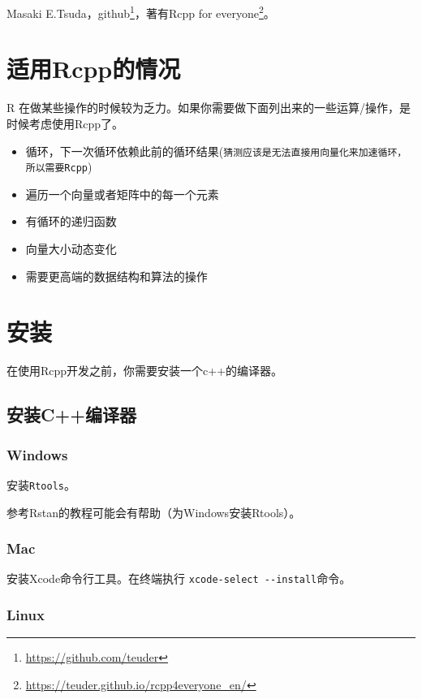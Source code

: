 \documentclass[]{ctexbook}
\providecommand{\tightlist}{%
  \setlength{\itemsep}{0pt}\setlength{\parskip}{0pt}}
\renewcommand{\href}[2]{#2\footnote{\url{#1}}}
\begin{document}
Masaki
E.Tsuda，\href{https://github.com/teuder}{github}，著有\href{https://teuder.github.io/rcpp4everyone_en/}{Rcpp
for everyone}。

\mainmatter

\chapter{适用Rcpp的情况}\label{situations}

R
在做某些操作的时候较为乏力。如果你需要做下面列出来的一些运算/操作，是时候考虑使用Rcpp了。

\begin{itemize}
\tightlist
\item
  循环，下一次循环依赖此前的循环结果(\texttt{猜测应该是无法直接用向量化来加速循环，所以需要Rcpp})
\item
  遍历一个向量或者矩阵中的每一个元素
\item
  有循环的递归函数
\item
  向量大小动态变化
\item
  需要更高端的数据结构和算法的操作
\end{itemize}

\chapter{安装}\label{install}

在使用Rcpp开发之前，你需要安装一个c++的编译器。

\section{安装C++编译器}\label{cppcompiler}

\subsection{Windows}\label{cppcwindows}

安装\texttt{Rtools}。

参考Rstan的教程可能会有帮助（为Windows安装Rtools）。

\subsection{Mac}\label{cppmac}

安装Xcode命令行工具。在终端执行 \texttt{xcode-select\ -\/-install}命令。

\subsection{Linux}\label{cpplinux}
\end{document}
